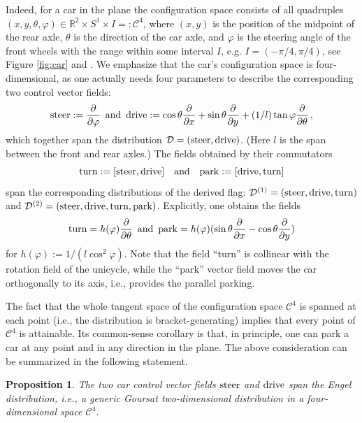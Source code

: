 \documentclass[11pt]{article}
\newtheorem{proposition}[lemma]{Proposition}
\theoremstyle{definition}
\newcounter{ai}
\begin{document}
Indeed, for a car in the plane the configuration space consists of all quadruples 
$(x,y, \theta, \varphi)\in \mathbb R^2\times S^1\times I=:\mathcal C^4$, where $(x,y)$ is the position of the midpoint 
of the rear axle, $\theta$ is the direction of the car axle, and $\varphi$ is the steering angle of the front wheels 
with the range within some interval $I$, e.g. $I=(-\pi/4, \pi/4)$, see Figure \ref{fig:car} and \cite{michor2008topics}. 
We emphasize that the car's configuration space is four-dimensional, as one actually needs four parameters to describe
the corresponding two control vector fields: 
$$
{\rm steer} := \frac{\partial}{\partial\varphi} \, {\text{ and }}\, {\rm drive} := \cos \theta \frac{\partial}{\partial x}
 +\sin\theta  \frac{\partial}{\partial y} +(1/l )\tan \varphi \frac{\partial}{\partial \theta}\,,
 $$
 which together span the distribution $\mathcal D=({\rm steer}, {\rm drive})$. (Here $l$ is the span between the front and rear axles.)
The fields obtained by their commutators 
 $$
 {\rm turn }:=[{\rm steer, drive}] \quad {\rm and} \quad {\rm park}:=[{\rm drive, turn}]
 $$ 
 span  the corresponding distributions of the derived flag: $\mathcal D^{(1)}=({\rm steer}, {\rm drive}, {\rm turn})$ and 
  $\mathcal D^{(2)}=({\rm steer}, {\rm drive}, {\rm turn}, {\rm park})$. 
  Explicitly, one obtains the fields
 $$
 {\rm turn}=h(\varphi)\frac{\partial}{\partial \theta} \, {\text{ and }}\,  
 {\rm park}=h(\varphi)(\sin \theta \frac{\partial}{\partial x}-\cos\theta  \frac{\partial}{\partial y} )
 $$
 for $h(\varphi):=1/(l\cos^2\varphi)$. Note that the field ``turn'' is collinear with the rotation field of the unicycle, while 
 the ``park'' vector field moves the car orthogonally to its axis, i.e., provides the parallel parking.
 
The fact that the  
 whole tangent space  of the configuration space $\mathcal C^4$ is spanned at each point (i.e., the distribution 
 is bracket-generating) implies  that every point of $\mathcal C^4$ is attainable. Its common-sense corollary is that, 
 in principle, one can park a car at any point and  in any direction in the plane. 
 The above consideration can be summarized in the following statement.

\begin{proposition}
The two car control vector fields ${\rm steer}$ and ${\rm drive}$ span the Engel distribution, i.e., a generic Goursat two-dimensional distribution in a four-dimensional space $\mathcal C^4$. 
\end{proposition}
\end{document}
